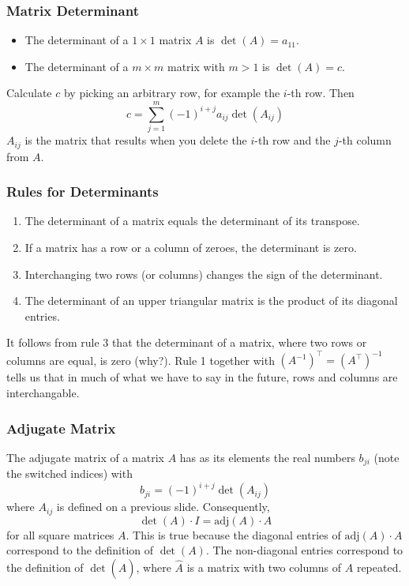 \documentclass[xcolor=dvipsnames]{beamer}
\begin{document}
\begin{frame}
  \frametitle{Matrix Determinant}
  \begin{itemize}
  \item The determinant of a $1\times{}1$ matrix $A$ is
    $\det(A)=a_{11}$.
  \item The determinant of a $m\times{}m$ matrix with $m>1$ is
    $\det(A)=c$. 
  \end{itemize}
  Calculate $c$ by picking an arbitrary row, for example the $i$-th
  row. Then
  \begin{equation}
    \label{eq:queiyesh}
    c=\sum_{j=1}^{m}(-1)^{i+j}a_{ij}\det(A_{ij})
  \end{equation}
  $A_{ij}$ is the matrix that results when you delete the $i$-th row
  and the $j$-th column from $A$.
\end{frame}

\begin{frame}
  \frametitle{Rules for Determinants}
  \begin{enumerate}
  \item The determinant of a matrix equals the determinant of its
    transpose.
  \item If a matrix has a row or a column of zeroes, the determinant
    is zero.
  \item Interchanging two rows (or columns) changes the sign of the
    determinant.
  \item The determinant of an upper triangular matrix is the product
    of its diagonal entries.
  \end{enumerate}
  It follows from rule 3 that the determinant of a matrix, where two
  rows or columns are equal, is zero (why?). Rule 1 together with
  $\left(A^{-1}\right)^{\intercal}=\left(A^{\intercal}\right)^{-1}$
  tells us that in much of what we have to say in the future, rows and
  columns are interchangable.
\end{frame}

\begin{frame}
  \frametitle{Adjugate Matrix}
The \alert{adjugate matrix} of a matrix $A$ has as its elements the
real numbers $b_{ji}$ (note the switched indices) with
\begin{equation}
  \label{eq:quesieha}
  b_{ji}=(-1)^{i+j}\det(A_{ij})
\end{equation}
where $A_{ij}$ is defined on a previous slide. Consequently,
\begin{equation}
  \label{eq:iegoowae}
  \det(A)\cdot{}I=\mbox{adj}(A)\cdot{}A
\end{equation}
for all square matrices $A$. This is true because the diagonal entries
of $\mbox{adj}(A)\cdot{}A$ correspond to the definition of $\det(A)$.
The non-diagonal entries correspond to the definition of
$\det(\hat{A})$, where $\hat{A}$ is a matrix with two columns of $A$
repeated.
\end{frame}
\end{document}

